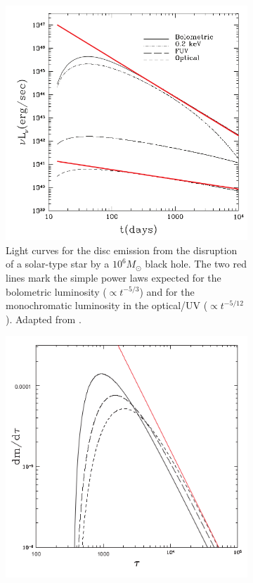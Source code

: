 \documentclass{tda}
\begin{document}
\begin{figure}
	\begin{subfigure} {.33\linewidth}
		\centering
		\captionsetup{width=.85\linewidth}
		\includegraphics[width=\textwidth]{./images/lodato_rossi2011.png}
		\caption{Light curves for the disc emission from the disruption of a solar-type star by a \(10^6 M_\odot\) black hole. The two red lines mark the simple power laws
expected for the bolometric luminosity (\(\propto t^{-5/3}\)) and for the monochromatic
luminosity in the optical/UV (\(\propto t^{-5/12}\)). Adapted from \cite{lodato_multiband_2011}.}
	\label{fig:lodatorossi2011}
	\end{subfigure}
	\begin{subfigure} {.33\linewidth}
		\centering
		\captionsetup{width=.85\linewidth}
		\includegraphics[width=\textwidth]{./images/lodato2009a.png}

\end{subfigure}
\end{figure}
\end{document}
